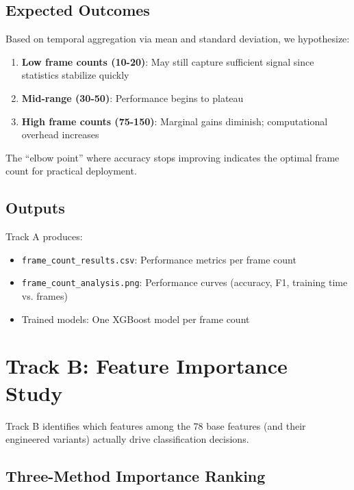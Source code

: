 \documentclass[11pt,a4paper]{article}
\begin{document}
\subsection{Expected Outcomes}

Based on temporal aggregation via mean and standard deviation, we hypothesize:

\begin{enumerate}
  \item \textbf{Low frame counts (10-20)}: May still capture sufficient signal since statistics stabilize quickly
  \item \textbf{Mid-range (30-50)}: Performance begins to plateau
  \item \textbf{High frame counts (75-150)}: Marginal gains diminish; computational overhead increases
\end{enumerate}

The ``elbow point'' where accuracy stops improving indicates the optimal frame count for practical deployment.

\subsection{Outputs}

Track A produces:
\begin{itemize}
  \item \texttt{frame\_count\_results.csv}: Performance metrics per frame count
  \item \texttt{frame\_count\_analysis.png}: Performance curves (accuracy, F1, training time vs. frames)
  \item Trained models: One XGBoost model per frame count
\end{itemize}

\section{Track B: Feature Importance Study}\label{sec:track-b}

Track B identifies which features among the 78 base features (and their engineered variants) actually drive classification decisions.

\subsection{Three-Method Importance Ranking}
\end{document}
